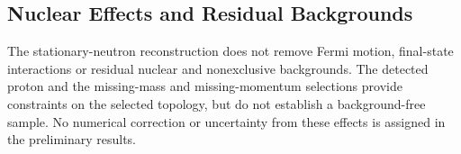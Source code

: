\subsection{Nuclear Effects and Residual Backgrounds}
The stationary-neutron reconstruction does not remove Fermi motion, final-state interactions or residual nuclear and nonexclusive backgrounds. The detected proton and the missing-mass and missing-momentum selections provide constraints on the selected topology, but do not establish a background-free sample. No numerical correction or uncertainty from these effects is assigned in the preliminary results.
